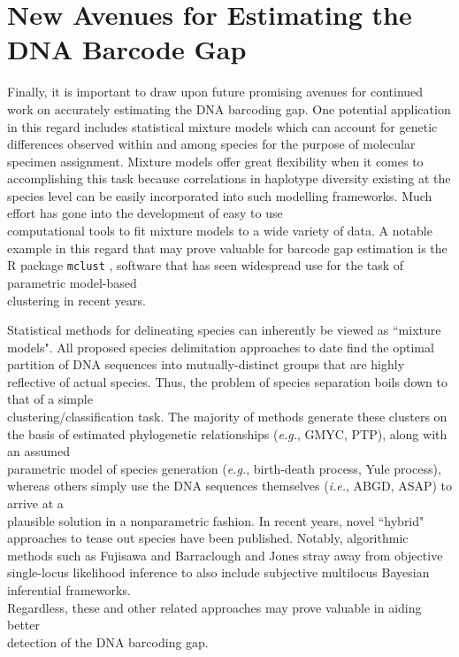 \section{New Avenues for Estimating the DNA Barcode Gap}

Finally, it is important to draw upon future promising avenues for continued work on accurately estimating the DNA barcoding gap. One potential application in this regard includes statistical mixture models which can account for genetic differences observed within and among species  for the purpose of molecular specimen assignment. Mixture models offer great flexibility when it comes to accomplishing this task because correlations in haplotype diversity existing at the species level can be easily incorporated into such modelling frameworks. Much effort has gone into the development of easy to use \\ computational tools to fit mixture models to a wide variety of data. A notable example in this regard that may prove valuable for barcode gap estimation is the R package {\tt mclust} \cite{scrucca2016mclust}, software that has seen widespread use for the task of parametric model-based \\ clustering in recent years.



Statistical methods for delineating species can inherently be viewed as ``mixture \\ models". All proposed species delimitation approaches to date find the optimal partition of DNA sequences into mutually-distinct groups that are highly reflective of actual species. Thus, the problem of species separation boils down to that of a simple \\ clustering/classification task. The majority of methods generate these clusters on the basis of estimated phylogenetic relationships (\textit{e.g.}, GMYC, PTP), along with an assumed \\ parametric model of species generation (\textit{e.g.}, birth-death process, Yule process), whereas others simply use the DNA sequences themselves (\textit{i.e.}, ABGD, ASAP) to arrive at a \\ plausible solution in a nonparametric fashion. In recent years, novel ``hybrid" approaches to tease out species have been published. Notably, algorithmic methods such as Fujisawa and Barraclough \cite{fujisawa2016rapid} and Jones \cite{jones2017algorithmic} stray away from objective single-locus likelihood inference to also include subjective multilocus Bayesian inferential frameworks. \\ Regardless, these and other related approaches may prove valuable in aiding better \\ detection of the DNA barcoding gap.



